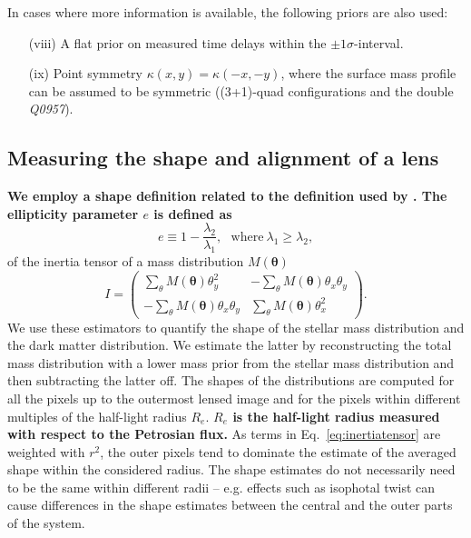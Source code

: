 \documentclass[useAMS,usenatbib]{mn2e}
\newcommand{\cb}[1]{{\color{red} \textbf{#1}}}
\begin{document}
In cases where more information is available, the following priors are also used:

\begin{enumerate}
\item[(viii)] A flat prior on measured time delays within the $\pm 1\sigma$-interval.
\item[(ix)] Point symmetry $\kappa(x,y) = \kappa(-x,-y)$, where the surface mass profile can be assumed to be symmetric ((3+1)-quad configurations and the double \textit{Q0957}).

\end{enumerate}

\subsection{Measuring the shape and alignment of a lens}\label{sec:shapemethod}
\cb{We employ a shape definition related to the definition used by \cite{2014arXiv1401.7990C}. The ellipticity parameter $e$ is defined as} %
\begin{equation}\label{eq:shapeestimate}
    e \equiv 1 - \frac{\lambda_{2}}{\lambda_{1}}, \ \ \ \mathrm{where} \ \lambda_{1} \geq \lambda_{2},
\end{equation}
of the inertia tensor of a mass distribution $M(\boldsymbol{\theta})$
\begin{equation}\label{eq:inertiatensor}
    I = \begin{pmatrix} \sum_\theta M(\boldsymbol{\theta})\theta^{2}_{y} & -\sum_\theta M(\boldsymbol{\theta})\theta_{x}\theta_{y} \\
                        -\sum_\theta M(\boldsymbol{\theta})\theta_{x}\theta_{y} & \sum_\theta M(\boldsymbol{\theta})\theta^{2}_{x} \end{pmatrix}.
\end{equation}
We use these estimators to quantify the shape of the stellar mass distribution and the dark matter distribution. We estimate the latter by reconstructing the total mass distribution with a lower mass prior from the stellar mass distribution and then subtracting the latter off. The shapes of the distributions are computed for all the pixels up to the outermost lensed image and for the pixels within different multiples of the half-light radius $R_e$. \cb{$R_e$ is the half-light radius measured with respect to the Petrosian flux.} As terms in Eq.~\ref{eq:inertiatensor} are weighted with $r^2$, the outer pixels tend to dominate the estimate of the averaged shape within the considered radius. The shape estimates do not necessarily need to be the same within different radii -- e.g. effects such as isophotal twist \citep[e.g.][and references therein]{1978ComAp...8...27B} can cause differences in the shape estimates between the central and the outer parts of the system.
\end{document}
